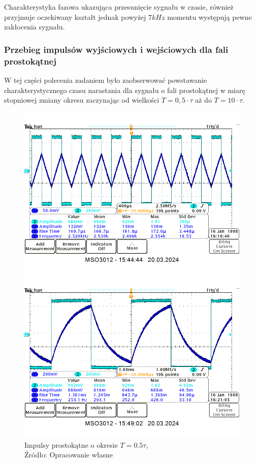 \documentclass{article}
\begin{document}
      Charakterystyka fazowa ukazująca przesunięcie sygnału w czasie, również przyjmuje oczekiwany kształt jednak powyżej $7kHz$ momentu występują pewne zakłocenia sygnału.

    \subsubsection{Przebieg impulsów wyjściowych i wejściowych dla fali prostokątnej}
      W tej części polecenia zadaniem było zaobserwować powstawanie charakterystycznego czasu narastania dla sygnału o fali prostokątnej w miarę stopniowej zmiany okresu zaczynając od wielkości  $T = 0,5 \cdot \tau$ aż do $T = 10 \cdot \tau$.

      \begin{figure}[!ht]
        \centering
        \begin{minipage}{.4\textwidth}
          \centering
          \includegraphics[scale=0.25]{grafiki/0.5t.png}
          \caption{Impulsy prostokątne o okresie $T = 0.5 \tau$,
            \\Źródło: Opracowanie własne}
        \end{minipage}
        \begin{minipage}{.4\textwidth}
          \centering
          \includegraphics[scale=0.25]{grafiki/5t.png}

\end{minipage}
\end{figure}
\end{document}
